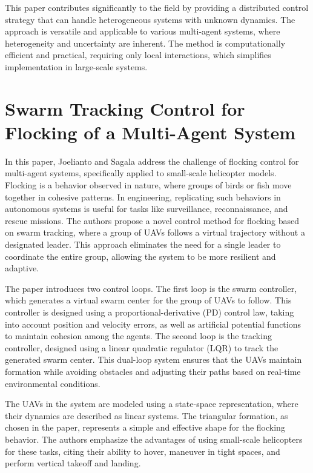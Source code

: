 \documentclass[a4paper,12pt]{article}
\begin{document}
This paper contributes significantly to the field by providing a distributed control strategy that can handle heterogeneous systems with unknown dynamics. The approach is versatile and applicable to various multi-agent systems, where heterogeneity and uncertainty are inherent. The method is computationally efficient and practical, requiring only local interactions, which simplifies implementation in large-scale systems.

\section{Swarm Tracking Control for Flocking of a Multi-Agent System \cite{joelianto2012swarm}}
In this paper, Joelianto and Sagala address the challenge of flocking control for multi-agent systems, specifically applied to small-scale helicopter models. Flocking is a behavior observed in nature, where groups of birds or fish move together in cohesive patterns. In engineering, replicating such behaviors in autonomous systems is useful for tasks like surveillance, reconnaissance, and rescue missions. The authors propose a novel control method for flocking based on swarm tracking, where a group of UAVs follows a virtual trajectory without a designated leader. This approach eliminates the need for a single leader to coordinate the entire group, allowing the system to be more resilient and adaptive.

The paper introduces two control loops. The first loop is the swarm controller, which generates a virtual swarm center for the group of UAVs to follow. This controller is designed using a proportional-derivative (PD) control law, taking into account position and velocity errors, as well as artificial potential functions to maintain cohesion among the agents. The second loop is the tracking controller, designed using a linear quadratic regulator (LQR) to track the generated swarm center. This dual-loop system ensures that the UAVs maintain formation while avoiding obstacles and adjusting their paths based on real-time environmental conditions.

The UAVs in the system are modeled using a state-space representation, where their dynamics are described as linear systems. The triangular formation, as chosen in the paper, represents a simple and effective shape for the flocking behavior. The authors emphasize the advantages of using small-scale helicopters for these tasks, citing their ability to hover, maneuver in tight spaces, and perform vertical takeoff and landing.
\end{document}

